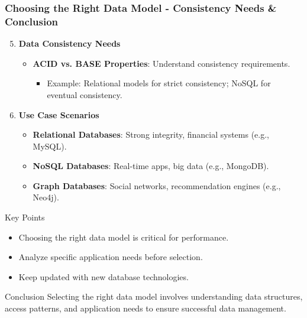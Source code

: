 \documentclass[aspectratio=169]{beamer}
\begin{document}
\begin{frame}[fragile]
    \frametitle{Choosing the Right Data Model - Consistency Needs & Conclusion}
    \begin{enumerate}
        \setcounter{enumi}{4}
        \item \textbf{Data Consistency Needs}
        \begin{itemize}
            \item \textbf{ACID vs. BASE Properties}: Understand consistency requirements.
                \begin{itemize}
                    \item Example: Relational models for strict consistency; NoSQL for eventual consistency.
                \end{itemize}
        \end{itemize}

        \item \textbf{Use Case Scenarios}
        \begin{itemize}
            \item \textbf{Relational Databases}: Strong integrity, financial systems (e.g., MySQL).
            \item \textbf{NoSQL Databases}: Real-time apps, big data (e.g., MongoDB).
            \item \textbf{Graph Databases}: Social networks, recommendation engines (e.g., Neo4j).
        \end{itemize}
    \end{enumerate}

    \begin{block}{Key Points}
        \begin{itemize}
            \item Choosing the right data model is critical for performance.
            \item Analyze specific application needs before selection.
            \item Keep updated with new database technologies.
        \end{itemize}
    \end{block}

    \begin{block}{Conclusion}
        Selecting the right data model involves understanding data structures, access patterns, and application needs to ensure successful data management. 
    \end{block}
\end{frame}
\end{document}

